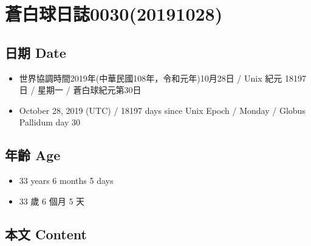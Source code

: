 \documentclass[a5paper, 12pt
]{book}
\providecommand{\tightlist}{%
  \setlength{\itemsep}{0pt}\setlength{\parskip}{0pt}}
\begin{document}
\hypertarget{ux84bcux767dux7403ux65e5ux8a8c003020191028}{%
\section{蒼白球日誌0030(20191028)}\label{ux84bcux767dux7403ux65e5ux8a8c003020191028}}

\hypertarget{ux65e5ux671f-date-29}{%
\subsection{日期 Date}\label{ux65e5ux671f-date-29}}

\begin{itemize}
\tightlist
\item
  世界協調時間2019年(中華民國108年，令和元年)10月28日 / Unix 紀元 18197
  日 / 星期一 / 蒼白球紀元第30日
\item
  October 28, 2019 (UTC) / 18197 days since Unix Epoch / Monday / Globus
  Pallidum day 30
\end{itemize}

\hypertarget{ux5e74ux9f61-age-29}{%
\subsection{年齡 Age}\label{ux5e74ux9f61-age-29}}

\begin{itemize}
\tightlist
\item
  33 years 6 months 5 days
\item
  33 歲 6 個月 5 天
\end{itemize}

\hypertarget{ux672cux6587-content-29}{%
\subsection{本文 Content}\label{ux672cux6587-content-29}}
\end{document}
